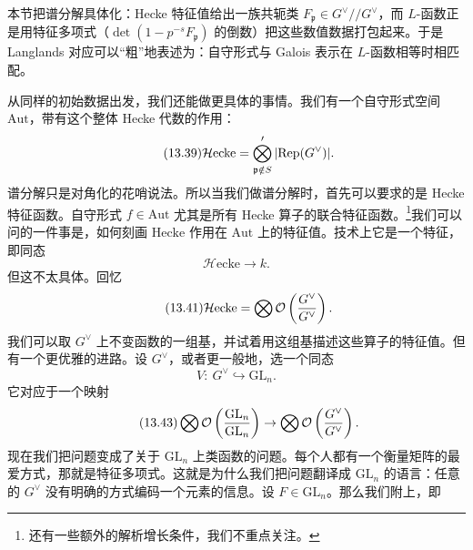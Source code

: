 \begin{sectionkey}
本节把谱分解具体化：Hecke 特征值给出一族共轭类 $F_{\mathfrak p}\in G^\vee/\!/G^\vee$，而 $L$-函数正是用特征多项式（$\det(1-p^{-s}F_{\mathfrak p})$ 的倒数）把这些数值数据打包起来。于是 Langlands 对应可以“粗”地表述为：自守形式与 Galois 表示在 $L$-函数相等时相匹配。
\end{sectionkey}

从同样的初始数据出发，我们还能做更具体的事情。我们有一个自守形式空间 $\mathrm{Aut}$，带有这个整体 Hecke 代数的作用：
\begin{equation}\tag{13.39}
\mathcal{H}\mathrm{ecke}=\bigotimes'_{\mathfrak p\notin S}|\mathrm{Rep}(G^\vee)|.
\end{equation}
谱分解只是对角化的花哨说法。所以当我们做谱分解时，首先可以要求的是 Hecke 特征函数。自守形式 $f\in\mathrm{Aut}$ 尤其是所有 Hecke 算子的联合特征函数。\footnote{还有一些额外的解析增长条件，我们不重点关注。}我们可以问的一件事是，如何刻画 $\mathrm{Hecke}$ 作用在 $\mathrm{Aut}$ 上的特征值。技术上它是一个特征，即同态
\begin{equation}\tag{13.40}
\mathcal{H}\mathrm{ecke}\to k.
\end{equation}
但这不太具体。回忆
\begin{equation}\tag{13.41}
\mathcal{H}\mathrm{ecke}=\bigotimes \mathcal{O}\left(\frac{G^\vee}{G^\vee}\right).
\end{equation}
我们可以取 $G^\vee$ 上不变函数的一组基，并试着用这组基描述这些算子的特征值。但有一个更优雅的进路。设 $G^\vee$，或者更一般地，选一个同态
\begin{equation}\tag{13.42}
V:\ G^\vee\hookrightarrow \mathrm{GL}_n.
\end{equation}
它对应于一个映射
\begin{equation}\tag{13.43}
\bigotimes\mathcal{O}\left(\frac{\mathrm{GL}_n}{\mathrm{GL}_n}\right)\to\bigotimes\mathcal{O}\left(\frac{G^\vee}{G^\vee}\right).
\end{equation}
现在我们把问题变成了关于 $\mathrm{GL}_n$ 上类函数的问题。每个人都有一个衡量矩阵的最爱方式，那就是特征多项式。这就是为什么我们把问题翻译成 $\mathrm{GL}_n$ 的语言：任意的 $G^\vee$ 没有明确的方式编码一个元素的信息。设 $F\in\mathrm{GL}_n$。那么我们附上\emph{}，即
